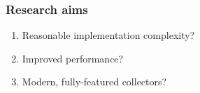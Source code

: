 \begin{frame}
    \frametitle{Research aims}
    \begin{enumerate}
        \item Reasonable implementation complexity?
        \item Improved performance?
        \item Modern, fully-featured collectors?
    \end{enumerate}
\end{frame}
